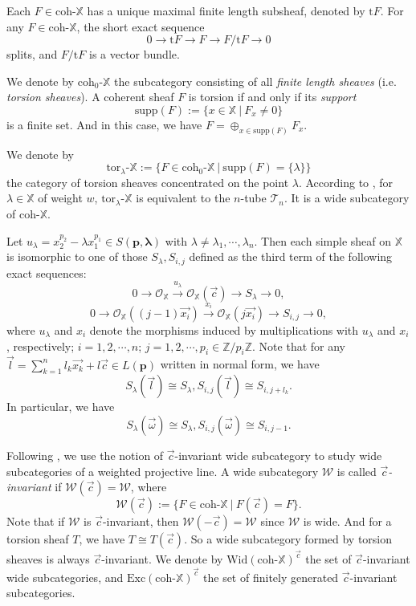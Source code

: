 \documentclass[a4paper, 11pt, reqno]{amsart}
\numberwithin{equation}{section}
\theoremstyle{remark}
\theoremstyle{definition}
\begin{document}
Each $F \in \mathrm{coh} \text{-} \mathbb X$ has a unique maximal finite length subsheaf, denoted by $\mathrm{t}F$. For any $F \in \mathrm{coh} \text{-} \mathbb X$, the short exact sequence
\[
0 \to \mathrm{t}F \to F \to F/\mathrm{t}F \to 0
\]
splits, and $F/\mathrm{t}F$ is a vector bundle.

We denote by $\mathrm{coh}_0 \text{-} \mathbb X$ the subcategory consisting of all \emph{finite length sheaves} (i.e. \emph{torsion sheaves}). A coherent sheaf $F$ is torsion if and only if its \emph{support} 
\[
   \mathrm{supp}(F):=\{x \in \mathbb X \ | \ F_x \neq 0 \}
\]
is a finite set. And in this case, we have $F=\oplus_{x \in \mathrm{supp}(F)} F_x$.

We denote by
\[
   \mathrm{tor}_{\lambda} \text{-} \mathbb X:=\{ F \in \mathrm{coh}_0 \text{-} \mathbb X \ | \ \mathrm{supp}(F)=\{ \lambda \} \}
\]
the category of torsion sheaves concentrated on the point $\lambda$. According to \cite[Subsection~2.4]{geigle1987class}, for $\lambda \in \mathbb X$ of weight $w$, $\mathrm{tor}_{\lambda} \text{-} \mathbb X$ is equivalent to the $n$-tube $\mathcal T_n$. It is a wide subcategory of $\mathrm{coh} \text{-} \mathbb X$.

Let $u_\lambda=x_2^{p_2}-\lambda x_1^{p_1} \in S(\bm p, \bm \lambda)$ with $\lambda \neq \lambda_1, \cdots, \lambda_n$. Then each simple sheaf on $\mathbb X$ is isomorphic to one of those $S_\lambda, S_{i,j}$ defined as the third term of the following exact sequences:
\[
 0 \to \mathcal O_{\mathbb X}\xrightarrow{u_\lambda} \mathcal O_{\mathbb X}(\vec c)\to S_\lambda \to 0,
\]
\[
 0 \to \mathcal O_{\mathbb X}((j-1)\vec {x_i})\xrightarrow{x_i} \mathcal O_{\mathbb X}(j\vec{x_i})\to S_{i,j} \to 0,
\]
where $u_\lambda$ and $x_i$ denote the morphisms induced by multiplications with $u_\lambda$ and $x_i$, respectively; $i=1,2, \cdots, n$; $j=1,2,\cdots,p_i \in \mathbb Z/ p_i \mathbb Z$. Note that for any $\vec l =\sum_{k=1}^n l_k \vec{x_k}+l \vec c \in L(\bm p)$ written in normal form, we have 
\[
   S_\lambda (\vec l) \cong S_\lambda, S_{i,j}(\vec l) \cong S_{i,j+l_k}.
\]
In particular, we have 
\[
   S_{\lambda}(\vec \omega) \cong S_\lambda, S_{i,j}(\vec \omega) \cong S_{i, j-1}.
\]

Following \cite{cheng2024wide}, we use the notion of $\vec c$-invariant wide subcategory to study wide subcategories of a weighted projective line. A wide subcategory $\mathcal W$ is called \emph{$\vec c$-invariant} if $\mathcal W(\vec c)=\mathcal W$, where 
\[\mathcal W(\vec c):=\{F \in \mathrm{coh}\text{-}\mathbb X \ | \ F(\vec c)=F\}.\]
Note that if $\mathcal W$ is $\vec c$-invariant, then $\mathcal W(-\vec c)=\mathcal W$ since $\mathcal W$ is wide. And for a torsion sheaf $T$, we have $T \cong T(\vec c)$. So a wide subcategory formed by torsion sheaves is always $\vec c$-invariant. We denote by $\mathrm{Wid}(\mathrm{coh} \text{-} \mathbb X)^{\vec c}$ the set of $\vec c$-invariant wide subcategories, and $\mathrm{Exc}(\mathrm{coh} \text{-} \mathbb X)^{\vec c}$ the set of finitely generated $\vec c$-invariant subcategories.
\end{document}
